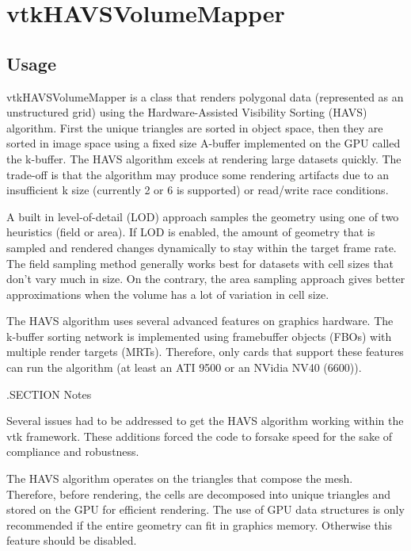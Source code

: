 \section{vtkHAVSVolumeMapper}

\subsection{Usage}


 vtkHAVSVolumeMapper is a class that renders polygonal data
 (represented as an unstructured grid) using the Hardware-Assisted
 Visibility Sorting (HAVS) algorithm.  First the unique triangles are sorted
 in object space, then they are sorted in image space using a fixed size
 A-buffer implemented on the GPU called the k-buffer.  The HAVS algorithm
 excels at rendering large datasets quickly.  The trade-off is that the
 algorithm may produce some rendering artifacts due to an insufficient k
 size (currently 2 or 6 is supported) or read/write race conditions.
 
 A built in level-of-detail (LOD) approach samples the geometry using one of
 two heuristics (field or area).  If LOD is enabled, the amount of geometry
 that is sampled and rendered changes dynamically to stay within the target
 frame rate.  The field sampling method generally works best for datasets
 with cell sizes that don't vary much in size.  On the contrary, the area
 sampling approach gives better approximations when the volume has a lot of
 variation in cell size.

 The HAVS algorithm uses several advanced features on graphics hardware.
 The k-buffer sorting network is implemented using framebuffer objects
 (FBOs) with multiple render targets (MRTs).  Therefore, only cards that
 support these features can run the algorithm (at least an ATI 9500 or an
 NVidia NV40 (6600)).

 .SECTION Notes

 Several issues had to be addressed to get the HAVS algorithm working within
 the vtk framework.  These additions forced the code to forsake speed for
 the sake of compliance and robustness.

 The HAVS algorithm operates on the triangles that compose the mesh.
 Therefore, before rendering, the cells are decomposed into unique triangles
 and stored on the GPU for efficient rendering.  The use of GPU data
 structures is only recommended if the entire geometry can fit in graphics
 memory.  Otherwise this feature should be disabled. 

